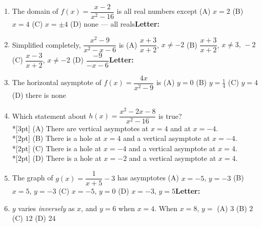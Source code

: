 \documentclass[10pt]{article}
\begin{document}
\begin{enumerate}[leftmargin=1.9em, itemsep=9pt]
  \item The domain of $f(x)=\dfrac{x-2}{x^2-16}$ is all real numbers except
    \hfill (A) $x=2$ \quad (B) $x=4$ \quad (C) $x=\pm 4$ \quad (D) none --- all reals\nobreak\hfill\mbox{\small\textbf{Letter:}\ \choicebox{\gradedblank[id=qb1, type=choice, points=2, answer={C}]{0.4in}{10pt}}}
  \item Simplified completely, $\dfrac{x^2-9}{x^2-x-6}$ is
    \hfill (A) $\dfrac{x+3}{x+2}$, $x\ne -2$ \quad (B) $\dfrac{x+3}{x+2}$, $x\ne 3,\,-2$ \quad (C) $\dfrac{x-3}{x+2}$, $x\ne -2$ \quad (D) $\dfrac{-9}{-x-6}$\nobreak\hfill\mbox{\small\textbf{Letter:}\ \choicebox{\gradedblank[id=qb2, type=choice, points=2, answer={B}]{0.4in}{10pt}}}
  \item The horizontal asymptote of $f(x)=\dfrac{4x}{x^2-9}$ is
    \hfill \llap{\choicebox{\gradedblank[id=qb3, type=choice, points=2, answer={A}]{0.2in}{10pt}}\,}(A) $y=0$ \quad (B) $y=\frac14$ \quad (C) $y=4$ \quad (D) there is none
  \item {}Which statement about $h(x)=\dfrac{x^2-2x-8}{x^2-16}$ is true?
    \\*[3pt]\hspace*{1.2em} (A) There are vertical asymptotes at $x=4$ and at $x=-4$.
    \\*[2pt]\hspace*{1.2em} (B) There is a hole at $x=4$ and a vertical asymptote at $x=-4$.
    \\*[2pt]\hspace*{1.2em} (C) There is a hole at $x=-4$ and a vertical asymptote at $x=4$.
    \\*[2pt]\hspace*{1.2em} (D) There is a hole at $x=-2$ and a vertical asymptote at $x=4$.
  \item The graph of $g(x)=\dfrac{1}{x+5}-3$ has asymptotes
    \hfill (A) $x=-5$, $y=-3$ \quad (B) $x=5$, $y=-3$ \quad (C) $x=-5$, $y=0$ \quad (D) $x=-3$, $y=5$\nobreak\hfill\mbox{\small\textbf{Letter:}\ \choicebox{\gradedblank[id=qb5, type=choice, points=2, answer={A}]{0.4in}{10pt}}}
  \item $y$ varies \emph{inversely} as $x$, and $y=6$ when $x=4$. When $x=8$, $y=$
    \hfill \llap{\choicebox{\gradedblank[id=qb6, type=choice, points=2, answer={A}]{0.35in}{10pt}}\enspace}(A) $3$ \quad (B) $2$ \quad (C) $12$ \quad (D) $24$
\end{enumerate}
\end{document}
